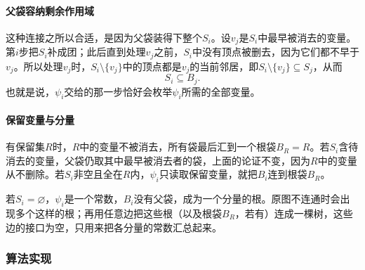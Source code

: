 \paragraph{父袋容纳剩余作用域}
这种连接之所以合适，是因为父袋装得下整个$S_i$。设$v_j$是$S_i$中最早被消去的变量。第$i$步把$S_i$补成团；此后直到处理$v_j$之前，$S_i$中没有顶点被删去，因为它们都不早于$v_j$。所以处理$v_j$时，$S_i\setminus\{v_j\}$中的顶点都是$v_j$的当前邻居，即$S_i\setminus\{v_j\}\subseteq S_j$，从而
\[
S_i\subseteq B_j .
\]
也就是说，$\psi_i$交给的那一步恰好会枚举$\psi_i$所需的全部变量。

\paragraph{保留变量与分量}
有保留集$R$时，$R$中的变量不被消去，所有袋最后汇到一个根袋$B_R=R$。若$S_i$含待消去的变量，父袋仍取其中最早被消去者的袋，上面的论证不变，因为$R$中的变量从不删除。若$S_i$非空且全在$R$内，$\psi_i$只读取保留变量，就把$B_i$连到根袋$B_R$。

若$S_i=\varnothing$，$\psi_i$是一个常数，$B_i$没有父袋，成为一个分量的根。原图不连通时会出现多个这样的根；再用任意边把这些根（以及根袋$B_R$，若有）连成一棵树，这些边的接口为空，只用来把各分量的常数汇总起来。

\subsubsection{算法实现}

